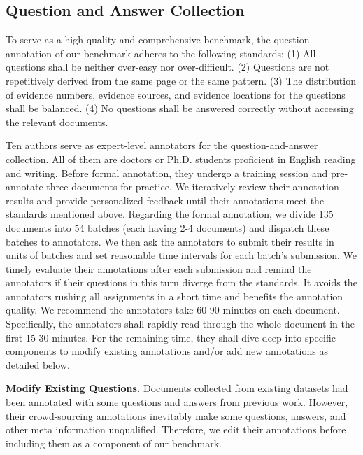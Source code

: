 \subsection{Question and Answer Collection}
\label{subsec: qa collection}
To serve as a high-quality and comprehensive benchmark, the question annotation of our benchmark adheres to the following standards: (1) All questions shall be neither over-easy nor over-difficult. (2) Questions are not repetitively derived from the same page or the same pattern. (3) The distribution of evidence numbers, evidence sources, and evidence locations for the questions shall be balanced. (4) No questions shall be answered correctly without accessing the relevant documents. 

Ten authors serve as expert-level annotators for the question-and-answer collection. All of them are doctors or Ph.D. students proficient in English reading and writing. Before formal annotation, they undergo a training session and pre-annotate three documents for practice. We iteratively review their annotation results and provide personalized feedback until their annotations meet the standards mentioned above. Regarding the formal annotation, we divide 135 documents into 54 batches (each having 2-4 documents) and dispatch these batches to annotators. We then ask the annotators to submit their results in units of batches and set reasonable time intervals for each batch's submission. We timely evaluate their annotations after each submission and remind the annotators if their questions in this turn diverge from the standards. It avoids the annotators rushing all assignments in a short time and benefits the annotation quality. We recommend the annotators take 60-90 minutes on each document. Specifically, the annotators shall rapidly read through the whole document in the first 15-30 minutes. For the remaining time, they shall dive deep into specific components to modify existing annotations and/or add new annotations as detailed below.

\noindent \textbf{Modify Existing Questions.} 
Documents collected from existing datasets had been annotated with some questions and answers from previous work. However, their crowd-sourcing annotations inevitably make some questions, answers, and other meta information unqualified. Therefore, we edit their annotations before including them as a component of our benchmark.

